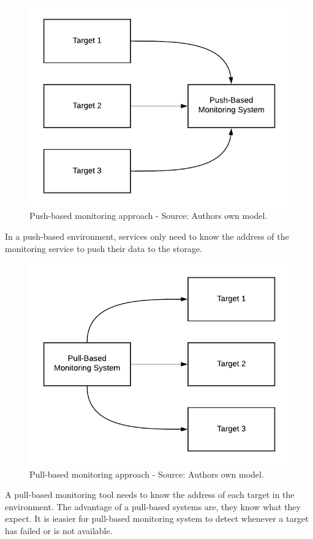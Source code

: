 \begin{figure}[h]
\centering
\includegraphics[scale=0.8]{images/02_theoretical_foundation/monitoring/push_based}
\caption{Push-based monitoring approach - Source: Authors own model.}
\label{fig:mon_push-based}
\end{figure}
In a push-based environment, services only need to know the address of the monitoring service to push their data to the storage.


\begin{figure}[h]%
\centering
\includegraphics[scale=0.8]{images/02_theoretical_foundation/monitoring/pull_based}%
\caption{Pull-based monitoring approach - Source: Authors own model.}%
\label{fig:mon_pull-based}%
\end{figure}
A pull-based monitoring tool needs to know the address of each target in the environment.
The advantage of a pull-based systems are, they know what they expect. It is ieasier for pull-based monitoring system to detect whenever a target has failed or is not available.


